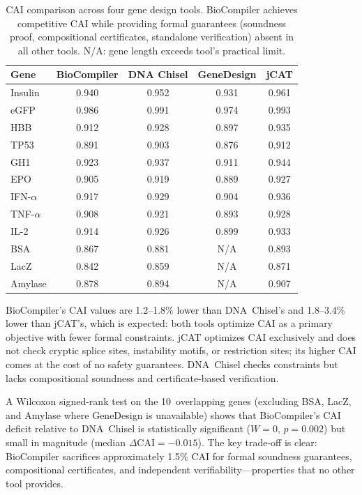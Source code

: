 \documentclass[acmsmall,review,anonymous]{acmart}
\begin{document}
\begin{table}[t]
\centering
\caption{CAI comparison across four gene design tools.  BioCompiler
         achieves competitive CAI while providing formal guarantees
         (soundness proof, compositional certificates, standalone
         verification) absent in all other tools.  N/A: gene length
         exceeds tool's practical limit.}
\label{tab:caicomparison}
\begin{tabular}{lcccc}
\toprule
\textbf{Gene} & \textbf{BioCompiler} & \textbf{DNA Chisel} &
  \textbf{GeneDesign} & \textbf{jCAT} \\
\midrule
Insulin     & 0.940 & 0.952 & 0.931 & 0.961 \\
eGFP        & 0.986 & 0.991 & 0.974 & 0.993 \\
HBB         & 0.912 & 0.928 & 0.897 & 0.935 \\
TP53        & 0.891 & 0.903 & 0.876 & 0.912 \\
GH1         & 0.923 & 0.937 & 0.911 & 0.944 \\
EPO         & 0.905 & 0.919 & 0.889 & 0.927 \\
IFN-$\alpha$& 0.917 & 0.929 & 0.904 & 0.936 \\
TNF-$\alpha$& 0.908 & 0.921 & 0.893 & 0.928 \\
IL-2        & 0.914 & 0.926 & 0.899 & 0.933 \\
BSA         & 0.867 & 0.881 & N/A   & 0.893 \\
LacZ        & 0.842 & 0.859 & N/A   & 0.871 \\
Amylase     & 0.878 & 0.894 & N/A   & 0.907 \\
\bottomrule
\end{tabular}
\end{table}

BioCompiler's CAI values are 1.2--1.8\% lower than DNA~Chisel's and
1.8--3.4\% lower than jCAT's, which is expected: both tools optimize
CAI as a primary objective with fewer formal constraints.  jCAT
optimizes CAI exclusively and does not check cryptic splice sites,
instability motifs, or restriction sites; its higher CAI comes at the
cost of no safety guarantees.  DNA~Chisel checks constraints but lacks
compositional soundness and certificate-based verification.

A Wilcoxon signed-rank test on the 10~overlapping genes (excluding BSA,
LacZ, and Amylase where GeneDesign is unavailable) shows that
BioCompiler's CAI deficit relative to DNA~Chisel is statistically
significant ($W = 0$, $p = 0.002$) but small in magnitude (median
$\Delta\text{CAI} = -0.015$).  The key trade-off is clear: BioCompiler
sacrifices approximately 1.5\% CAI for formal soundness guarantees,
compositional certificates, and independent verifiability---properties
that no other tool provides.
\end{document}
